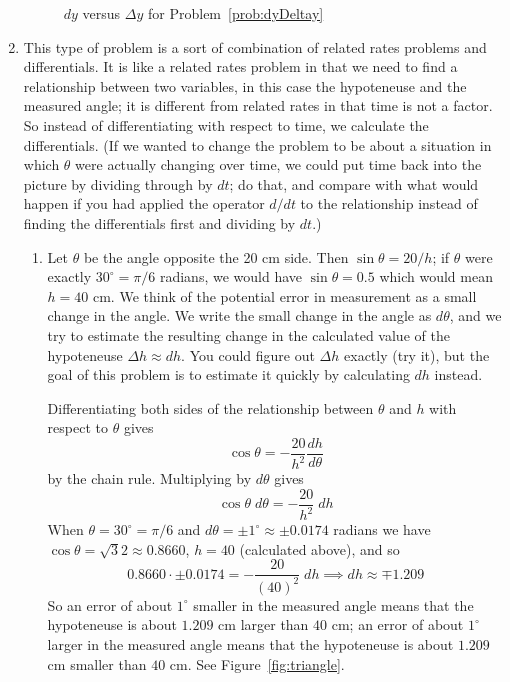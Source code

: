 \documentclass{article}
\begin{document}
\begin{enumerate}
\begin{figure}[htbp]
    \caption{$dy$ versus $\Delta y$ for Problem~\ref{prob:dyDeltay}}
    \label{fig:dyDeltay}
  \end{figure}
\item \label{prob:triangle} %
  This type of problem is a sort of combination of related rates
  problems and differentials.  It is like a related rates problem in
  that we need to find a relationship between two variables, in this
  case the hypoteneuse and the measured angle; it is different from
  related rates in that time is not a factor.  So instead of
  differentiating with respect to time, we calculate the
  differentials.  (If we wanted to change the problem to be about a
  situation in which $\theta$ were actually changing over time, we
  could put time back into the picture by dividing through by $dt$; do
  that, and compare with what would happen if you had applied the
  operator $d/dt$ to the relationship instead of finding the
  differentials first and dividing by $dt$.)
  \begin{enumerate}
  \item Let $\theta$ be the angle opposite the 20 cm side.  Then
    $\sin\theta = 20/h$; if $\theta$ were exactly $30^{\circ}=\pi/6$
    radians, we would have $\sin\theta = 0.5$ which would mean $h=40$
    cm.  We think of the potential error in measurement as a small
    change in the angle.  We write the small change in the angle as
    $d\theta$, and we try to estimate the resulting change in the
    calculated value of the hypoteneuse $\Delta h \approx dh$.  You
    could figure out $\Delta h$ exactly (try it), but the goal of this
    problem is to estimate it quickly by calculating $dh$ instead.

    Differentiating both sides of the relationship between $\theta$
    and $h$ with respect to $\theta$ gives
    \begin{equation*}
      \cos\theta = -\frac{20}{h^2} \frac{dh}{d\theta}
    \end{equation*}
    by the chain rule.  Multiplying by $d\theta$ gives
    \begin{equation*}
      \cos\theta \; d\theta = -\frac{20}{h^2} \; dh
    \end{equation*}
    When $\theta=30^{\circ}=\pi/6$ and $d\theta=\pm 1^{\circ}\approx\pm 0.0174$ 
    radians
    we have $\cos\theta = \sqrt{3}{2} \approx 0.8660$, $h=40$ (calculated
    above), and so
    \begin{equation*}
      0.8660 \cdot \pm 0.0174 = -\frac{20}{(40)^2} \; dh
      \implies dh \approx \mp 1.209
    \end{equation*}
    So an error of about $1^{\circ}$ smaller in the measured angle
    means that the hypoteneuse is about $1.209$ cm larger than $40$
    cm; an error of about $1^{\circ}$ larger in the measured angle
    means that the hypoteneuse is about $1.209$ cm smaller than $40$
    cm.  See Figure~\ref{fig:triangle}.


\end{enumerate}
\end{enumerate}
\end{document}
